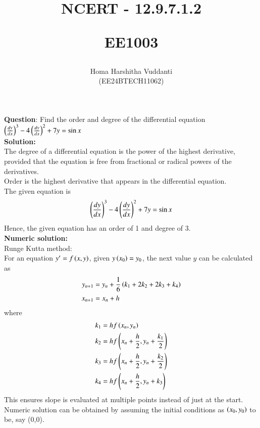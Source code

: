 \documentclass[journal]{IEEEtran}
\begin{document}


\title{
NCERT - 12.9.7.1.2

\large{EE1003}
}
\author{Homa Harshitha Vuddanti

(EE24BTECH11062)
}	

\maketitle

\bigskip

\renewcommand{\thefigure}{\theenumi}
\renewcommand{\thetable}{\theenumi}
\textbf{Question}: Find the order and degree of the differential equation $\left(\frac{dy}{dx}\right)^3-4\left(\frac{dy}{dx}\right)^2+7y=\sin x$\\
\textbf{Solution:} \\
The degree of a differential equation is the power of the highest derivative, provided that the equation is free from fractional or radical powers of the derivatives.\\
Order is the highest derivative that appears in the differential equation.\\
The given equation is 
\begin{align}
\left(\frac{dy}{dx}\right)^3-4\left(\frac{dy}{dx}\right)^2+7y=\sin x \label{eq:1}
\end{align}
Hence, the given equation has an order of 1 and degree of 3.\\
\textbf{Numeric solution:}\\
Runge Kutta method:\\
For an equation $y^\prime=f\left(x,y\right)$, given $y\left(x_0\right)=y_0$, the next value $y$ can be calculated as
\begin{align}
y_{n+1}&=y_n+\frac{1}{6}\left(k_1+2k_2+2k_3+k_4\right)\\
x_{n+1}&=x_n+h
\end{align}
where
\begin{align}
k_1&=hf\left(x_n,y_n\right)\\
k_2&=hf\left(x_n+\frac{h}{2},y_n+\frac{k_1}{2}\right)\\
k_3&=hf\left(x_n+\frac{h}{2},y_n+\frac{k_2}{2}\right)\\
k_4&=hf\left(x_n+\frac{h}{2},y_n+k_3\right)
\end{align}
This ensures slope is evaluated at multiple points instead of just at the start. \\
Numeric solution can be obtained by assuming the initial conditions as $\left(x_0,y_0\right)$ to be, say (0,0).\\
\end{document}
